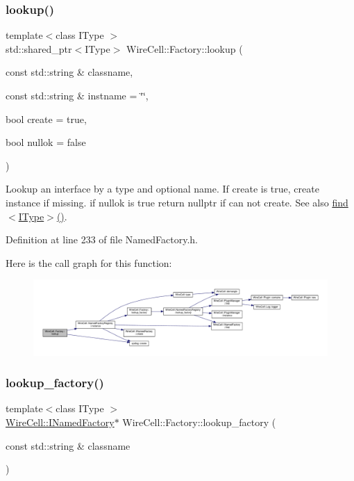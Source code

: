 \subsubsection{\texorpdfstring{lookup()}{lookup()}}
{\footnotesize\ttfamily template$<$class I\+Type $>$ \\
std\+::shared\+\_\+ptr$<$I\+Type$>$ Wire\+Cell\+::\+Factory\+::lookup (\begin{DoxyParamCaption}\item[{const std\+::string \&}]{classname,  }\item[{const std\+::string \&}]{instname = {\ttfamily \char`\"{}\char`\"{}},  }\item[{bool}]{create = {\ttfamily true},  }\item[{bool}]{nullok = {\ttfamily false} }\end{DoxyParamCaption})}

Lookup an interface by a type and optional name. If create is true, create instance if missing. if nullok is true return nullptr if can not create. See also \hyperlink{namespace_wire_cell_1_1_factory_abfb60a87055b2837f69e65cd27d9cb26}{find$<$\+I\+Type$>$()}. 

Definition at line 233 of file Named\+Factory.\+h.

Here is the call graph for this function\+:
\nopagebreak
\begin{figure}[H]
\begin{center}
\leavevmode
\includegraphics[width=350pt]{namespace_wire_cell_1_1_factory_a17712091b6e64cd7936ec21901b32b39_cgraph}
\end{center}
\end{figure}
\mbox{\label{namespace_wire_cell_1_1_factory_a33318e89ff05184cf57267d20bdc076c}} 
\subsubsection{\texorpdfstring{lookup\+\_\+factory()}{lookup\_factory()}}
{\footnotesize\ttfamily template$<$class I\+Type $>$ \\
\hyperlink{class_wire_cell_1_1_i_named_factory}{Wire\+Cell\+::\+I\+Named\+Factory}$\ast$ Wire\+Cell\+::\+Factory\+::lookup\+\_\+factory (\begin{DoxyParamCaption}\item[{const std\+::string \&}]{classname }\end{DoxyParamCaption})}



